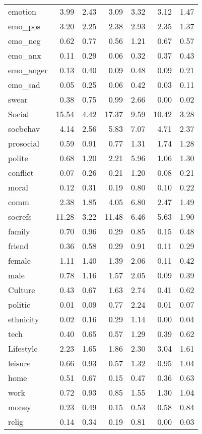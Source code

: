 \begin{longtable}{@{}p{3.4cm}rrrrrr@{}}
emotion & 3.99 & 2.43 & 3.09 & 3.32 & 3.12 & 1.47 \\
emo\_pos & 3.20 & 2.25 & 2.38 & 2.93 & 2.35 & 1.37 \\
emo\_neg & 0.62 & 0.77 & 0.56 & 1.21 & 0.67 & 0.57 \\
emo\_anx & 0.11 & 0.29 & 0.06 & 0.32 & 0.37 & 0.43 \\
emo\_anger & 0.13 & 0.40 & 0.09 & 0.48 & 0.09 & 0.21 \\
emo\_sad & 0.05 & 0.25 & 0.06 & 0.42 & 0.03 & 0.11 \\
swear & 0.38 & 0.75 & 0.99 & 2.66 & 0.00 & 0.02 \\
Social & 15.54 & 4.42 & 17.37 & 9.59 & 10.42 & 3.28 \\
socbehav & 4.14 & 2.56 & 5.83 & 7.07 & 4.71 & 2.37 \\
prosocial & 0.59 & 0.91 & 0.77 & 1.31 & 1.74 & 1.28 \\
polite & 0.68 & 1.20 & 2.21 & 5.96 & 1.06 & 1.30 \\
conflict & 0.07 & 0.26 & 0.21 & 1.20 & 0.08 & 0.21 \\
moral & 0.12 & 0.31 & 0.19 & 0.80 & 0.10 & 0.22 \\
comm & 2.38 & 1.85 & 4.05 & 6.80 & 2.47 & 1.49 \\
socrefs & 11.28 & 3.22 & 11.48 & 6.46 & 5.63 & 1.90 \\
family & 0.70 & 0.96 & 0.29 & 0.85 & 0.15 & 0.48 \\
friend & 0.36 & 0.58 & 0.29 & 0.91 & 0.11 & 0.29 \\
female & 1.11 & 1.40 & 1.39 & 2.06 & 0.11 & 0.42 \\
male & 0.78 & 1.16 & 1.57 & 2.05 & 0.09 & 0.39 \\
Culture & 0.43 & 0.67 & 1.63 & 2.74 & 0.41 & 0.62 \\
politic & 0.01 & 0.09 & 0.77 & 2.24 & 0.01 & 0.07 \\
ethnicity & 0.02 & 0.16 & 0.29 & 1.14 & 0.00 & 0.04 \\
tech & 0.40 & 0.65 & 0.57 & 1.29 & 0.39 & 0.62 \\
Lifestyle & 2.23 & 1.65 & 1.86 & 2.30 & 3.04 & 1.61 \\
leisure & 0.66 & 0.93 & 0.57 & 1.32 & 0.95 & 1.04 \\
home & 0.51 & 0.67 & 0.15 & 0.47 & 0.36 & 0.63 \\
work & 0.72 & 0.93 & 0.85 & 1.55 & 1.30 & 1.04 \\
money & 0.23 & 0.49 & 0.15 & 0.53 & 0.58 & 0.84 \\
relig & 0.14 & 0.34 & 0.19 & 0.81 & 0.00 & 0.03 \\

\end{longtable}
